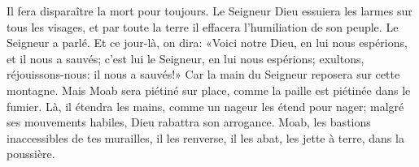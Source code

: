 Il fera disparaître la mort pour toujours.
Le Seigneur Dieu essuiera les larmes sur tous les visages,
	et par toute la terre il effacera l’humiliation de son peuple.
	Le Seigneur a parlé.
Et ce jour-là, on dira: «Voici notre Dieu,
	en lui nous espérions, et il nous a sauvés;
	c’est lui le Seigneur, en lui nous espérions;
	exultons, réjouissons-nous: il nous a sauvés!»
Car la main du Seigneur reposera sur cette montagne.
Mais Moab sera piétiné sur place,
	comme la paille est piétinée dans le fumier.
Là, il étendra les mains, comme un nageur les étend pour nager;
	malgré ses mouvements habiles, Dieu rabattra son arrogance.
Moab, les bastions inaccessibles de tes murailles,
	il les renverse, il les abat,
	les jette à terre, dans la poussière.
